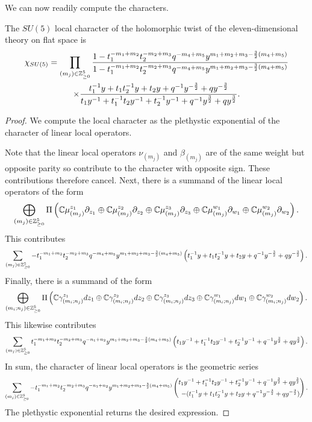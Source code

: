 We can now readily compute the characters.
\begin{prop}
The $SU(5)$ local character of the holomorphic twist of the eleven-dimensional theory on flat space is
\begin{multline}
\chi_{SU(5)} = 
\prod_ {(m_j)\in \mathbb{Z}^5_{\geq 0}} \frac{1- t_1^{-m_1+m_2}t_2^{-m_2+m_3}q^{-m_4+m_5}y^{m_1+m_2+m_3-\frac 3 2 (m_4+m_5)}}{1- t_1^{-m_1+m_2}t_2^{-m_2+m_3}q^{-m_4+m_5}y^{m_1+m_2+m_3-\frac 3 2 (m_4+m_5)} }
\\ 
\times \frac{t_1^{-1}y + t_1t_2^{-1}y + t_2y + q^{-1}y^{-\frac 3 2} + qy^{-\frac 3 2}}{t_1y^{-1} + t_1^{-1}t_2y^{-1} + t_2^{-1}y^{-1} + q^{-1}y^{\frac 3 2} + qy^{\frac 3 2}}.
\end{multline}
\end{prop}
\begin{proof}
We compute the local character as the plethystic exponential of the character of linear local operators. 

Note that the linear local operators $ \nu_{(m_j)}$ and $\beta_{(m_j)}$ are of the same weight but opposite parity so contribute to the character with opposite sign. These contributions therefore cancel. Next, there is a summand of the linear local operators of the form 
\[
\bigoplus _{(m_j)\in \mathbb{Z}^5_{\geq 0 }} \Pi \left ( \mathbb{C}\mu^{z_1}_{(m_j)}\partial_{z_1}\oplus \mathbb{C}\mu^{z_2}_{(m_j)}\partial_{z_2}\oplus \mathbb{C}\mu^{z_3}_{(m_j)}\partial_{z_3}\oplus\mathbb{C}\mu^{w_1}_{(m_j)}\partial_{w_1}\oplus \mathbb{C}\mu^{w_2}_{(m_j)}\partial_{w_2}\right).
\] 
This contributes 
\[
\sum_{(m_j)\in \mathbb{Z}^5_{\geq 0 }}- t_1^{-m_1+m_2}t_2^{-m_2+m_3}q^{-m_4+m_5}y^{m_1+m_2+m_3-\frac 3 2 (m_4+m_5)}\left (t_1^{-1}y + t_1t_2^{-1}y + t_2y + q^{-1}y^{-\frac 3 2} + qy^{-\frac 3 2} \right).
\] 
Finally, there is a summand of the form 
\[
\bigoplus _{(m_i;n_j)\in \mathbb{Z}^5_{\geq 0 }} \Pi \left ( \mathbb{C}\gamma^{z_1}_{(m_i; n_j)}d{z_1}\oplus \mathbb{C}\gamma^{z_2}_{(m_i; n_j)}d{z_2}\oplus\mathbb{C}\gamma^{z_3}_{(m_i; n_j)}d{z_3}\oplus\mathbb{C}\gamma^{w_1}_{(m_i; n_j)}d{w_1}\oplus \mathbb{C}\gamma^{w_2}_{(m_i; n_j)}d {w_2}\right).
\] 
This likewise contributes 
\[
\sum_{(m_j)\in \mathbb{Z}^5_{\geq 0 }}t_1^{-m_1+m_2}t_2^{-m_2+m_3}q^{-n_1+n_2}y^{m_1+m_2+m_3-\frac 3 2 (m_4+m_5)}\left (t_1y^{-1} + t_1^{-1}t_2y^{-1} + t_2^{-1}y^{-1} + q^{-1}y^{\frac 3 2} + qy^{\frac 3 2} \right).
\] 
In sum, the character of linear local operators is the geometric series 
\[
\sum_{(m_j)\in \mathbb{Z}^5_{\geq 0 }}-t_1^{-m_1+m_2}t_2^{-m_2+m_3}q^{-n_1+n_2}y^{m_1+m_2+m_3-\frac 3 2 (m_4+m_5)}\left (\begin{aligned}t_1y^{-1} + t_1^{-1}t_2y^{-1} + t_2^{-1}y^{-1} + q^{-1}y^{\frac 3 2} + qy^{\frac 3 2} \\  - (t_1^{-1}y + t_1t_2^{-1}y + t_2y + q^{-1}y^{-\frac 3 2} + qy^{-\frac 3 2})\end{aligned}\right).
\] 
The plethystic exponential returns the desired expression.

\end{proof}
\fi

